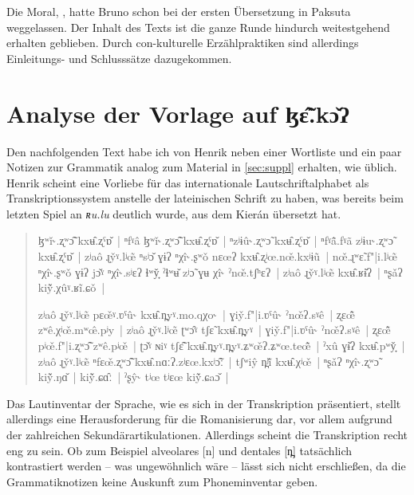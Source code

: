 \documentclass[
	12pt,
	ngerman,
]{scrartcl}
\newcommand{\fw}[1]{\textit{#1}} %
\newcommand{\Lhengko}{ɮɛ̃̂.kɔ̌ʔ}
\begin{document}
Die Moral, 
\autocite[77]{jacobs1894}, hatte Bruno schon bei der ersten Übersetzung in
Paksuta weggelassen. Der Inhalt des Texts ist die ganze Runde hindurch
weitestgehend erhalten geblieben. Durch con-kulturelle Erzählpraktiken sind
allerdings Einleitungs- und Schlusssätze dazugekommen.


\section{Analyse der Vorlage auf \Lhengko}
\label{sec:lhenganalys}

Den nachfolgenden Text habe ich von Henrik neben einer Wortliste und ein paar
Notizen zur Grammatik analog zum Material in \cref{sec:suppl} erhalten, wie
üblich. Henrik scheint eine Vorliebe für das internationale Lautschriftalphabet
als Transkriptionssystem anstelle der lateinischen Schrift zu haben, was
bereits beim letzten Spiel an \fw{ʀu.lu} deutlich wurde, aus dem Kierán
übersetzt hat.

\begin{quote}
\begin{sloppypar}
	ɮʷǐ˞.ʐʷɔ̃̂ kxʉ̂.ʐˤɒ̌~|
	ⁿfˠâ ɮʷǐ˞.ʐʷɔ̃̂ kxʉ̂.ʐˤɒ̌~|
	ⁿzʲɨû˞.ʐʷɔ̃ kxʉ̂.ʐˤɒ̌~|
	ⁿfˠã̂.fˠã zʲɨu˞.ʐʷɔ̃ kxʉ̂.ʐˤɒ̌~|
	zʲaô ɻy̌ˠ.lʲœ̃ ⁿsʲɔ̌ ɣɨʔ ⁿχî˞.ʂʷǒ nɛœʔ kxʉ̂.ʐʲœ.nœ̌.kxʲɨũ~|
	nœ̌.ɻʷɛ̃.f"|i.lʲœ̃ ⁿχî˞.ʂʷǒ ɣɨʔ jɔ̌ˠ ⁿχî˞.sʲɛʔ ɬʷy̟̌ ˀɬʷʉ̌ zʲɔ̃ ɣʉ χî˞ ˀnœ̌.tʃʰɛʔ~|
	zʲaô ɻy̌ˠ.lʲœ̃ kxʉ̂.ʁɨ̌ʔ~|
	ⁿʂǎʔ kiỹ̌.χûˠ.ʁĩ.ɕǒ~|
	
	zʲaô ɻy̌ˠ.lʲœ̃ pɛœ̌ˠ.ʋˤû˞ kxʉ̂.n̪yˠ.mo.qχo˞~|
	ɣiy̌.f"|i.ʋˤû˞ ˀnœ̌ʔ.sˠê~|
	ʐɛœ̃̂ zʷê.χʲœ̌.mʷœ̂.pʲy~|
	zʲaô ɻy̌ˠ.lʲœ̃ ʈʷɔ̂ˠ tʃɛ̃ kxʉ̂.n̪yˠ~|
	ɣiy̌.f"|i.ʋˤû˞ ˀnœ̌ʔ.sˠê~|
	ʐɛœ̃̂ pʲœ̌.f"|i.ʐʷɔ̃̂ zʷê.pʲœ̌~|
	ʈɔ̌ˠ ɴiˠ tʃɛ̃̂ kxʉ̂.n̪yˠ.n̪yˠ.ʑʷœ̌ʔ.ʑʷœ.teœ̃̂~|
	ˀxû ɣɨ̌ʔ kxʉ̂.pʷy̟̌~|
	zʲaô ɻy̌ˠ.lʲœ̃ ⁿfɛœ̌.ʐʷɔ̃̂ kxʉ̂.nɑːʔ.zʲɛœ.kxʲɔ̃̂ː~|
	tʃʷiŷ n̪ʲĩ̌ kxʉ̂.χʲœ̌~|
	ⁿʂǎʔ ⁿχî˞.ʐʷɔ̃ kiỹ̌.ŋɑ̌~|
	kiỹ̌.ɕɑ̂ː~|
	ˀʂŷ˞ tʲœ tʲɛœ kiỹ̌.ɕaɔ̌~|
\end{sloppypar}
\end{quote}

Das Lautinventar der Sprache, wie es sich in der Transkription präsentiert,
stellt allerdings eine Herausforderung für die Romanisierung dar, vor allem
aufgrund der zahlreichen Sekundärartikulationen. Allerdings scheint die
Transkription recht eng zu sein. Ob zum Beispiel alveolares [n] und dentales
[n̪] tatsächlich kontrastiert werden -- was ungewöhnlich wäre -- lässt sich
nicht erschließen, da die Grammatiknotizen keine Auskunft zum Phoneminventar
geben.
\end{document}
